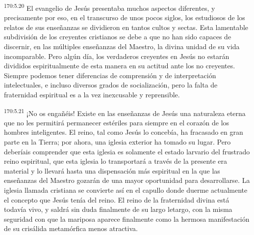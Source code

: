 \par
\textsuperscript{170:5.20} El evangelio de Jesús presentaba muchos aspectos diferentes, y precisamente por eso, en el transcurso de unos pocos siglos, los estudiosos de los relatos de sus enseñanzas se dividieron en tantos cultos y sectas. Esta lamentable subdivisión de los creyentes cristianos se debe a que no han sido capaces de discernir, en las múltiples enseñanzas del Maestro, la divina unidad de su vida incomparable. Pero algún día, los verdaderos creyentes en Jesús no estarán divididos espiritualmente de esta manera en su actitud ante los no creyentes. Siempre podemos tener diferencias de comprensión y de interpretación intelectuales, e incluso diversos grados de socialización, pero la falta de fraternidad espiritual es a la vez inexcusable y reprensible.

\par
\textsuperscript{170:5.21} ¡No os engañéis! Existe en las enseñanzas de Jesús una naturaleza eterna que no les permitirá permanecer estériles para siempre en el corazón de los hombres inteligentes. El reino, tal como Jesús lo concebía, ha fracasado en gran parte en la Tierra; por ahora, una iglesia exterior ha tomado su lugar. Pero deberíais comprender que esta iglesia es solamente el estado larvario del frustrado reino espiritual, que esta iglesia lo transportará a través de la presente era material y lo llevará hasta una dispensación más espiritual en la que las enseñanzas del Maestro gozarán de una mayor oportunidad para desarrollarse. La iglesia llamada cristiana se convierte así en el capullo donde duerme actualmente el concepto que Jesús tenía del reino. El reino de la fraternidad divina está todavía vivo, y saldrá sin duda finalmente de su largo letargo, con la misma seguridad con que la mariposa aparece finalmente como la hermosa manifestación de su crisálida metamórfica menos atractiva.